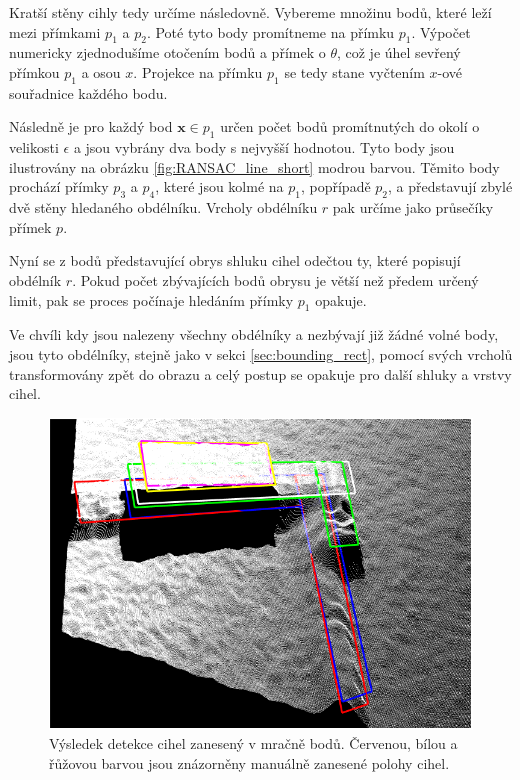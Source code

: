 \documentclass[twoside]{ctuthesis}
\begin{document}
Kratší stěny cihly tedy určíme následovně. Vybereme množinu bodů, které leží mezi přímkami $p_1$ a $p_2$. Poté tyto body promítneme na přímku $p_1$. Výpočet numericky zjednodušíme otočením bodů a přímek o $\theta$, což je úhel sevřený přímkou $p_1$ a osou $x$. Projekce na přímku $p_1$ se tedy stane vyčtením $x$-ové souřadnice každého bodu.

Následně je pro každý bod $\mathbf{x} \in p_1$ určen počet bodů promítnutých do okolí o velikosti $\epsilon$ a jsou vybrány dva body s nejvyšší hodnotou. Tyto body jsou ilustrovány na obrázku \ref{fig:RANSAC_line_short} modrou barvou. Těmito body prochází přímky $p_3$ a $p_4$, které jsou kolmé na $p_1$, popřípadě $p_2$, a představují zbylé dvě stěny hledaného obdélníku. Vrcholy obdélníku $r$ pak určíme jako průsečíky přímek $p$.

Nyní se z bodů představující obrys shluku cihel odečtou ty, které popisují obdélník $r$. Pokud počet zbývajících bodů obrysu je větší než předem určený limit, pak se proces počínaje hledáním přímky $p_1$ opakuje.

Ve chvíli kdy jsou nalezeny všechny obdélníky a nezbývají již žádné volné body, jsou tyto obdélníky, stejně jako v sekci \ref{sec:bounding_rect}, pomocí svých vrcholů transformovány zpět do obrazu a celý postup se opakuje pro další shluky a vrstvy cihel.
\begin{figure}
    \centering
    \includegraphics[width = \linewidth]{pictures/upraveno_3rdlayaer.png}
    \caption[Výsledek detekce cihel zanesený v mračně bodů]{Výsledek detekce cihel zanesený v mračně bodů. Červenou, bílou a řůžovou barvou jsou znázorněny manuálně zanesené polohy cihel.}
    \label{fig:all_layers_det}
\end{figure}
\end{document}

